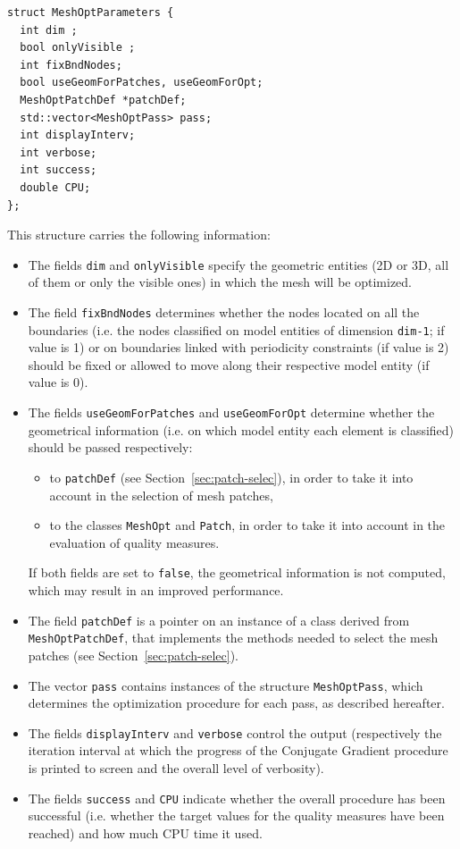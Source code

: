 \documentclass[12pt,a4paper,a4wide]{article}
\begin{document}
\begin{verbatim}
struct MeshOptParameters {
  int dim ;
  bool onlyVisible ;
  int fixBndNodes;
  bool useGeomForPatches, useGeomForOpt;
  MeshOptPatchDef *patchDef;
  std::vector<MeshOptPass> pass;
  int displayInterv;
  int verbose;
  int success;
  double CPU;
};
\end{verbatim}

This structure carries the following information:
\begin{itemize}
\item The fields \texttt{dim} and \texttt{onlyVisible} specify the
geometric entities (2D or 3D, all of them or only the visible ones)
in which the mesh will be optimized.
\item The field \texttt{fixBndNodes} determines whether the nodes
located on all the boundaries (i.e. the nodes classified on model
entities of dimension \texttt{dim-1}; if value is 1) or on boundaries linked
with periodicity constraints (if value is 2)  should be fixed or allowed to
move along their respective model entity (if value is 0).
\item The fields \texttt{useGeomForPatches} and \texttt{useGeomForOpt}
determine whether the geometrical information (i.e. on which model
entity each element is classified) should be passed respectively:
\begin{itemize}
\item to \texttt{patchDef} (see Section~\ref{sec:patch-selec}), in
order to take it into account in the selection of mesh patches,
\item to the classes \texttt{MeshOpt} and \texttt{Patch}, in order
to take it into account in the evaluation of quality measures.
\end{itemize}
If both fields are set to \texttt{false}, the geometrical information
is not computed, which may result in an improved performance.
\item The field \texttt{patchDef} is a pointer on an instance of a
class derived from \texttt{MeshOptPatchDef}, that implements the
methods needed to select the mesh patches (see
Section~\ref{sec:patch-selec}).
\item The vector \texttt{pass} contains instances of the structure
\texttt{MeshOptPass}, which determines the optimization procedure
for each pass, as described hereafter.
\item The fields \texttt{displayInterv} and \texttt{verbose} control
the output (respectively the iteration interval at which the progress
of the Conjugate Gradient procedure is printed to screen and the
overall level of verbosity).
\item The fields \texttt{success} and \texttt{CPU} indicate whether
the overall procedure has been successful (i.e. whether the target
values for the quality measures have been reached) and how much CPU
time it used.
\end{itemize}
\end{document}
